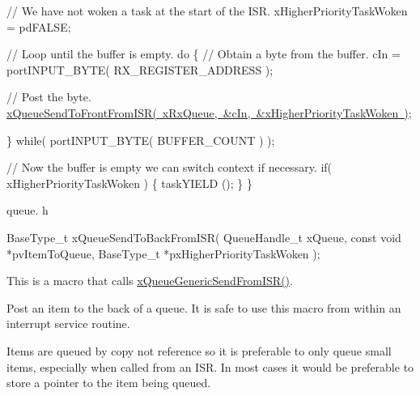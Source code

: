 \begin{DoxyPre}   // We have not woken a task at the start of the ISR.
   xHigherPriorityTaskWoken = pdFALSE;\end{DoxyPre}



\begin{DoxyPre}   // Loop until the buffer is empty.
   do
   \{
    // Obtain a byte from the buffer.
    cIn = portINPUT\_BYTE( RX\_REGISTER\_ADDRESS );\end{DoxyPre}



\begin{DoxyPre}    // Post the byte.
    \mbox{\hyperlink{queue_8h_af03b83396462affe9e28302660e7b9c6}{xQueueSendToFrontFromISR( xRxQueue, \&cIn, \&xHigherPriorityTaskWoken )}};\end{DoxyPre}



\begin{DoxyPre}   \} while( portINPUT\_BYTE( BUFFER\_COUNT ) );\end{DoxyPre}



\begin{DoxyPre}   // Now the buffer is empty we can switch context if necessary.
   if( xHigherPriorityTaskWoken )
   \{
    taskYIELD ();
   \}
\}
\end{DoxyPre}


queue. h 
\begin{DoxyPre}
BaseType\_t xQueueSendToBackFromISR(
                                     QueueHandle\_t xQueue,
                                     const void *pvItemToQueue,
                                     BaseType\_t *pxHigherPriorityTaskWoken
                                  );
\end{DoxyPre}


This is a macro that calls \mbox{\hyperlink{queue_8h_a263711eb0124112e828a18fd4b8ab29d}{x\+Queue\+Generic\+Send\+From\+I\+S\+R()}}.

Post an item to the back of a queue. It is safe to use this macro from within an interrupt service routine.

Items are queued by copy not reference so it is preferable to only queue small items, especially when called from an I\+SR. In most cases it would be preferable to store a pointer to the item being queued.


